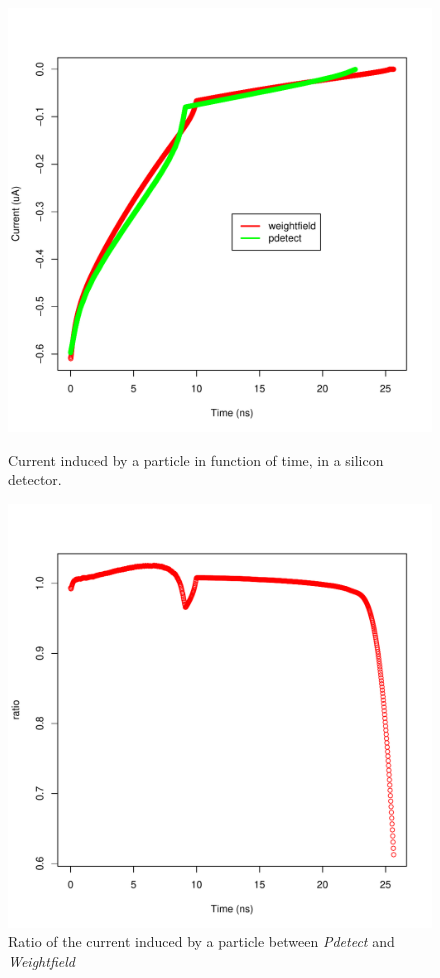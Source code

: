 \documentclass[11pt]{article}
\begin{document}
				\begin{figure}[H]
					\begin{minipage}[b]{.46\linewidth}
						\center
						\includegraphics[scale=0.5]{images/applications/silicon_current.pdf}
						\caption{Current induced by a particle in function of time, in a silicon detector.}
						\label{fig:silicon}
					\end{minipage} \hfill
					\begin{minipage}[b]{.46\linewidth}
						\center
						\includegraphics[scale=0.5]{images/applications/silicon_ratio.pdf}
						\caption{Ratio of the current induced by a particle between \textit{Pdetect} and
								\textit{Weightfield}}
						\label{fig:silicon_ratio}
					\end{minipage}
				\end{figure}
\end{document}

